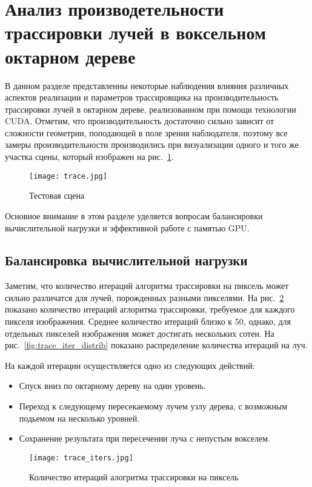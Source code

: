 \section{Анализ производетельности трассировки лучей в воксельном октарном дереве}

В данном разделе представленны некоторые наблюдения влияния различных аспектов реализации и параметров трассировщика на производительность трассировки лучей в октарном дереве, реализованном при помощи технологии CUDA. Отметим, что производительность достаточно сильно зависит от сложности геометрии, поподающей в поле зрения наблюдателя, поэтому все замеры производительности производились при визуализации одного и того же участка сцены, который изображен на рис.~\ref{fig:trace_scene}.

\begin{figure}[h]
\center
\texttt{[image: trace.jpg]}
\caption{Тестовая сцена}
\label{fig:trace_scene}
\end{figure}

Основное внимание в этом разделе уделяется вопросам балансировки вычислительной нагрузки и эффективной работе с памятью GPU.

\subsection{Балансировка вычислительной нагрузки}

Заметим, что количество итераций алгоритма трассировки на пиксель может сильно различатся для лучей, порожденных разными пикселями. На рис.~\ref{fig:trace_iters} показано количество итераций аглоритма трассировки, требуемое для каждого пикселя изображения. Среднее количество итераций близко к 50, однако, для отдельных пикселей изображения может достигать нескольких сотен. На рис.~\ref{fig:trace_iter_distrib} показано распределение количества итераций на луч.

На каждой итерации осуществляется одно из следующих действий:

\begin{itemize}
  \item Спуск вниз по октарному дереву на один уровень.
  \item Переход к следующему пересекаемому лучем узлу дерева, с возможным подьемом на несколько уровней.
  \item Сохранение результата при пересечении луча с непустым вокселем.
\end{itemize}

\begin{figure}[h]
\center
\texttt{[image: trace\_iters.jpg]}
\caption{Количество итераций алогритма трассировки на пиксель}
\label{fig:trace_iters}
\end{figure}

